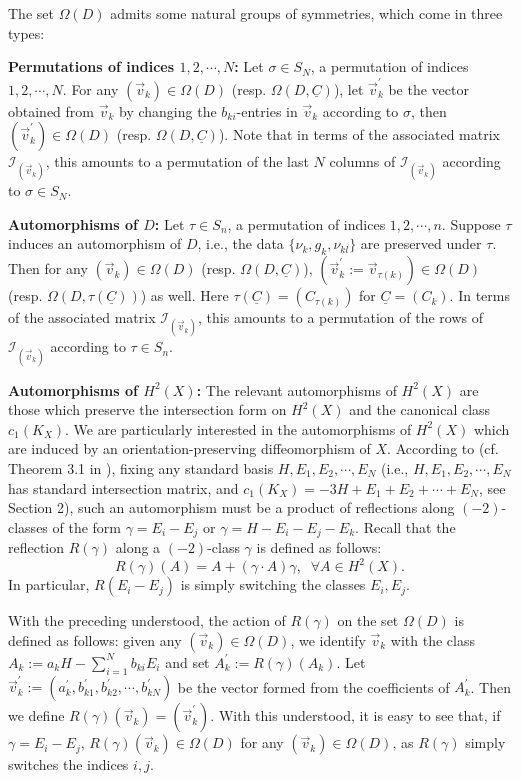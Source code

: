 \documentclass[11pt]{amsart}
\theoremstyle{plain}
\numberwithin{theorem}{section}
\theoremstyle{definition}
\newcommand{\I}{{\mathcal I}}
\begin{document}
The set $\Omega(D)$ admits some natural groups of symmetries, which come in three types:

\vspace{1mm}

{\bf Permutations of indices $1,2,\cdots,N$:} Let $\sigma\in S_N$, a permutation of indices $1,2,\cdots,N$. For any $(\vec{v}_k)\in\Omega(D)$ (resp. $\Omega(D,\underline{C})$), let $\vec{v}_k^\prime$ be the vector obtained 
from $\vec{v}_k$ by changing the $b_{ki}$-entries in $\vec{v}_k$ according to 
$\sigma$, then $(\vec{v}_k^\prime)\in \Omega(D)$ (resp. $\Omega(D,\underline{C})$). Note that in terms of the
associated matrix $\I_{(\vec{v}_k)}$, this amounts to a permutation of the last $N$ columns of $\I_{(\vec{v}_k)}$
according to $\sigma\in S_N$.

\vspace{1mm}

{\bf Automorphisms of $D$:} Let $\tau\in S_n$, a permutation of indices $1,2,\cdots,n$. Suppose $\tau$ induces an automorphism of $D$, i.e., the data $\{\nu_k, g_k, \nu_{kl}\}$ are preserved under $\tau$. Then for any $(\vec{v}_k)\in\Omega(D)$ (resp. $\Omega(D,\underline{C})$), $(\vec{v}_k^\prime:=\vec{v}_{\tau(k)})\in \Omega(D)$  
(resp. $\Omega(D,\tau(\underline{C}))$) as well. Here $\tau(\underline{C})=(C_{\tau(k)})$ for $\underline{C}=(C_k)$.
In terms of the associated matrix $\I_{(\vec{v}_k)}$, this amounts to a permutation of the rows of $\I_{(\vec{v}_k)}$
according to $\tau\in S_n$.


\vspace{1mm}

{\bf Automorphisms of $H^2(X)$:} The relevant automorphisms of $H^2(X)$ are those which preserve the intersection form on $H^2(X)$ and the canonical class $c_1(K_X)$. We are particularly interested in the automorphisms of $H^2(X)$ which are induced by an orientation-preserving diffeomorphism of $X$. According to \cite{LL} (cf. Theorem 3.1 in \cite{LL}), fixing any standard basis $H,E_1,E_2,\cdots,E_N$ (i.e., $H,E_1,E_2,\cdots,E_N$ has standard intersection matrix, and $c_1(K_X)=-3H+E_1+E_2+\cdots+E_N$, see Section 2), such an automorphism must be a product of reflections along $(-2)$-classes of the form 
$\gamma=E_i-E_j$ or $\gamma=H-E_i-E_j-E_k$. 
Recall that the reflection $R(\gamma)$ along a $(-2)$-class $\gamma$ is defined as follows:
$$
R(\gamma)(A)=A+(\gamma\cdot A)\gamma, \;\; \forall A\in H^2(X). 
$$
In particular, $R(E_i-E_j)$ is simply switching the classes $E_i,E_j$. 

With the preceding understood, the action of $R(\gamma)$ on the set $\Omega(D)$ is defined as follows:
given any $(\vec{v}_k)\in \Omega(D)$, we identify $\vec{v}_k$ with the class
$A_k:=a_kH-\sum_{i=1}^N b_{ki}E_i$ and set $A_k^\prime:=R(\gamma)(A_k)$. Let 
$\vec{v}_k^\prime:=(a_k^\prime, b_{k1}^\prime, b_{k2}^\prime, \cdots, b_{kN}^\prime)$ be the vector 
formed from the coefficients of $A_k^\prime$. Then we define $R(\gamma)(\vec{v}_k)=(\vec{v}_k^\prime)$. 
With this understood, it is easy to see that, if $\gamma=E_i-E_j$,  $R(\gamma)(\vec{v}_k)\in \Omega(D)$ for any 
$(\vec{v}_k)\in \Omega(D)$, as $R(\gamma)$ simply switches the indices $i,j$. 
\end{document}
